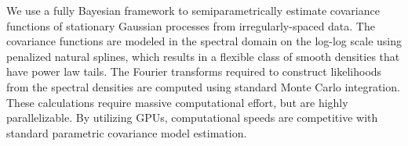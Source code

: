 We use a fully Bayesian framework to semiparametrically estimate covariance functions of stationary Gaussian processes from irregularly-spaced data. The covariance functions are modeled in the spectral domain on the log-log scale using penalized natural splines, which results in a flexible class of smooth densities that have power law tails. The Fourier transforms required to construct likelihoods from the spectral densities are computed using standard Monte Carlo integration. These calculations require massive computational effort, but are highly parallelizable. By utilizing GPUs, computational speeds are competitive with standard parametric covariance model estimation.